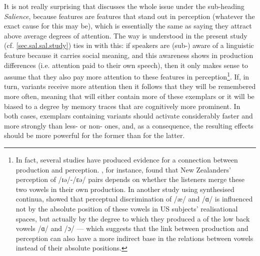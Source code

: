 It is not really surprising that \textcite{pierrehumbert2006} discusses the whole issue under the sub-heading \emph{Salience}, because  features are features that stand out in perception (whatever the exact cause for this may be), which is essentially the same as saying they attract above average degrees of attention.
The way  is understood in the present study (cf. \ref{sec.sal.sal.study}) ties in with this: if speakers are (sub-) aware of a linguistic feature because it carries social meaning, and this awareness shows in production differences (i.e. attention paid to their own speech), then it only makes sense to assume that they also pay more attention to these features in perception\footnote{In fact, several studies have produced evidence for a connection between production and perception. \cite{hayetal2006b}, for instance, found that New Zealanders' perception of /ɪə/-/ɛə/ pairs depends on whether the listeners merge these two vowels in their own production. In another study using synthesised  continua, \textcite{kendallfridland2017} showed that perceptual discrimination of /æ/ and /ɑ/ is influenced not by the absolute position of these vowels in US subjects' realisational spaces, but actually by the degree to which they produced a  of the low back vowels /ɑ/ and /ɔ/ --- which suggests that the link between production and perception can also have a more indirect base in the relations between vowels instead of their absolute positions.}.
If, in turn,  variants receive more attention then it follows that they will be remembered more often, meaning that  will either contain more of these exemplars or it will be biased to a degree by  memory traces that are cognitively more prominent.
In both cases, exemplars containing  variants should activate considerably faster and more strongly than less- or non- ones, and, as a consequence, the resulting  effects should be more powerful for the former than for the latter.

